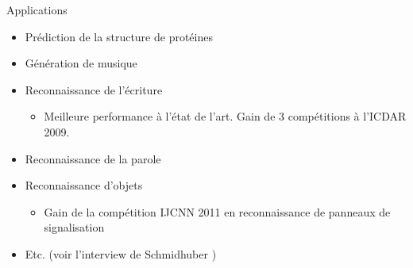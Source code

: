 \begin{frame}{Applications}
    \begin{itemize}
        \item Prédiction de la structure de protéines \cite{Sonderby14}
        \item Génération de musique \cite{Eck02}
        \item Reconnaissance de l'écriture \cite{Graves09a,Graves09b}
        \begin{itemize}
            \item Meilleure performance à l'état de l'art. Gain de 3 compétitions à l'ICDAR 2009.
        \end{itemize}
        \item Reconnaissance de la parole \cite{Graves13a,Graves13b}
        \item Reconnaissance d'objets \cite{Ciresan11a}
        \begin{itemize}
            \item Gain de la compétition IJCNN 2011 en reconnaissance de panneaux de signalisation \cite{Ciresan11b}
        \end{itemize}
        \item Etc. {\footnotesize (voir l'interview de Schmidhuber \cite{Angelica12}})
    \end{itemize}
\end{frame}

